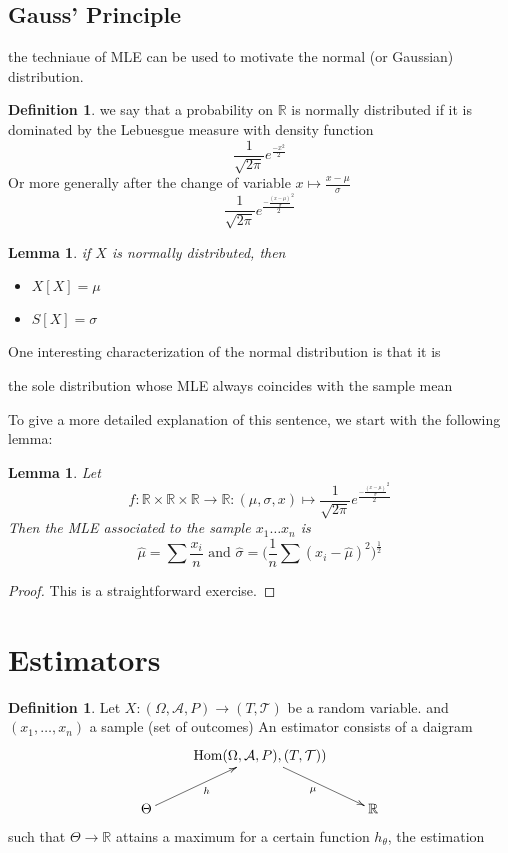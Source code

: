 \documentclass{book}
\theoremstyle{plain}
\newtheorem{lemma}[corollary]{Lemma}
\theoremstyle{definition}
\newtheorem{definition}[corollary]{Definition}
\renewcommand{\d}[1]{\mathbb{#1}}
\newcommand{\fun}{\mapsto}
\DeclareMathOperator{\Hom}{Hom}
\newcommand{\mor}{\longrightarrow}
\renewcommand{\r}[1]{\mathcal{#1}}
\renewcommand{\r}[1]{\mathcal{#1}}
\begin{document}
\subsection{Gauss' Principle} the techniaue of MLE can be used to motivate the normal (or Gaussian) distribution.
\begin{definition}
we say that a probability on $\d{R}$ is normally distributed if it is dominated by the Lebuesgue measure with density function
\[
\frac{1}{\sqrt{2\pi}}e^{\frac{-x^2}{2}}
\]
Or more generally after the change of variable $x\fun \frac{x-\mu}{\sigma}$
\[
\frac{1}{\sqrt{2\pi}}e^{\frac{-\frac{(x-\mu)}{\sigma}^2}{2}}
\]
\end{definition}
\begin{lemma}
if $X$ is normally distributed, then
\begin{itemize}
\item $X[X]=\mu$
\item $S[X]=\sigma$	
\end{itemize}

\end{lemma}

One interesting characterization of the normal distribution is that it is \begin{center}
the sole distribution whose MLE always coincides with the sample mean\end{center}
To give a more detailed explanation of this sentence, we start with the following lemma:
\begin{lemma}
Let
\[
f:\d{R}\times \d{R}\times \d{R}\mor \d{R}:(\mu,\sigma,x)\fun \frac{1}{\sqrt{2\pi}}e^{\frac{-\frac{(x-\mu)}{\sigma}^2}{2}}
\]	
Then the MLE associated to the sample $x_1\ldots x_n$ is
\[
\hat{\mu}=\sum \frac{x_i}{n}\textrm{ and }\hat{\sigma}=\big(\frac{1}{n}\sum(x_i-\hat{\mu})^2)^\frac{1}{2}
\]
\end{lemma}
\begin{proof}
This is a straightforward exercise.	
\end{proof}
\section{Estimators}

\begin{definition}
Let $X:(\Omega,\r{A},P)\mor (T,\r{T})$ be a random variable. and $(x_1,\ldots , x_n)$ a sample (set of outcomes) An estimator consists of a daigram
\begin{displaymath}
\xymatrix{
&  \Hom(\Omega,\r{A},P), (T,\r{T}))\ar[dr]_\mu\\
\Theta\ar[ur]_h & & \d{R}
}	
\end{displaymath}
such that $\Theta\mor \d{R}$ attains a maximum for a certain function $h_\theta$, the estimation
\end{definition}
\end{document}

